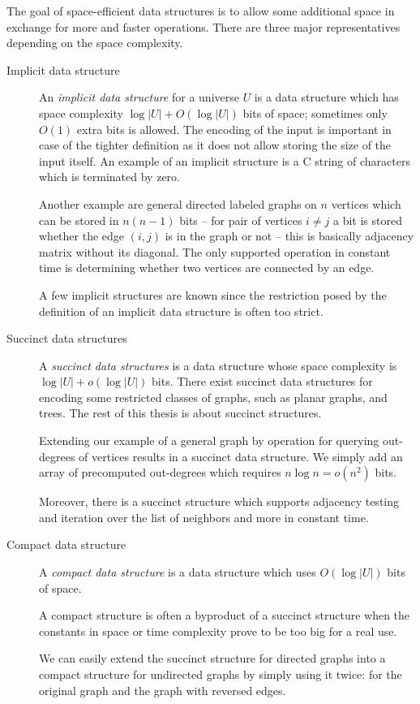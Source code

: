 The goal of space-efficient data structures is to allow some additional space in exchange for more and faster operations.
There are three major representatives depending on the space complexity.

\begin{description}
	\item[Implicit data structure]
	An \emph{implicit data structure} for a universe $U$ is a data structure which has space complexity $ \log |U| + O(\log |U|) $ bits of space; sometimes only $O(1)$ extra bits is allowed.
	The encoding of the input is important in case of the tighter definition as it does not allow storing the size of the input itself.
	An example of an implicit structure is a C string of characters which is terminated by zero.
	
	Another example\label{ex:implicit-graph} are general directed labeled graphs on $n$ vertices which can be stored in $n (n - 1)$ bits -- for pair of vertices $i \ne j$ a bit is stored whether the edge $(i, j)$ is in the graph or not -- this is basically adjacency matrix without its diagonal.
	The only supported operation in constant time is determining whether two vertices are connected by an edge.
	
	A few implicit structures are known since the restriction posed by the definition of an implicit data structure is often too strict.

	\item[Succinct data structures]
	A \emph{succinct data structures} is a data structure whose space complexity is $ \log |U| + o(\log |U|) $ bits.
	There exist succinct data structures for encoding some restricted classes of graphs, such as planar graphs, and trees.
	The rest of this thesis is about succinct structures.
	
	Extending our example of a general graph by operation for querying out-degrees of vertices results in a succinct data structure.
	We simply add an array of precomputed out-degrees which requires $n \log n = o(n^2)$ bits.
	
	Moreover, there is a succinct structure which supports adjacency testing and iteration over the list of neighbors and more in constant time. \cite[Theorem~6.1]{raman2007succinct}
	
	\item[Compact data structure]
	A \emph{compact data structure} is a data structure which uses $ O(\log |U|) $ bits of space.
	
	A compact structure is often a byproduct of a succinct structure when the constants in space or time complexity prove to be too big for a real use. \cite{gonzalez2005practical}
	
	We can easily extend the succinct structure for directed graphs into a compact structure for undirected graphs by simply using it twice: for the original graph and the graph with reversed edges.
\end{description}

